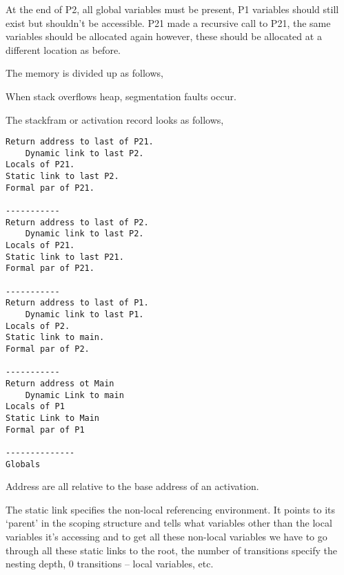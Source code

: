 \documentclass[a4paper]{scrartcl}
\theoremstyle{definition}
\begin{document}
At the end of P2, all global variables must be present, P1 variables should still exist but shouldn't be accessible. P21 made a recursive call to P21, the same variables should be allocated again however, these should be allocated at a different location as before.

The memory is divided up as follows,

\begin{tikzpicture}

\end{tikzpicture}

When stack overflows heap, segmentation faults occur.

The stackfram or activation record looks as follows,
\begin{verbatim}
Return address to last of P21.
	Dynamic link to last P2.
Locals of P21.
Static link to last P2.
Formal par of P21.

-----------
Return address to last of P2.
	Dynamic link to last P2.
Locals of P21.
Static link to last P21.
Formal par of P21.

-----------
Return address to last of P1.
	Dynamic link to last P1.
Locals of P2.
Static link to main.
Formal par of P2.

-----------
Return address ot Main
	Dynamic Link to main
Locals of P1
Static Link to Main
Formal par of P1

--------------
Globals
\end{verbatim}
Address are all relative to the base address of an activation.

The static link specifies the non-local referencing environment. It points to its `parent' in the scoping structure and tells what variables other than the local variables it's accessing and to get all these non-local variables we have to go through all these static links to the root, the number of transitions specify the nesting depth, 0 transitions -- local variables, etc.
\end{document}
